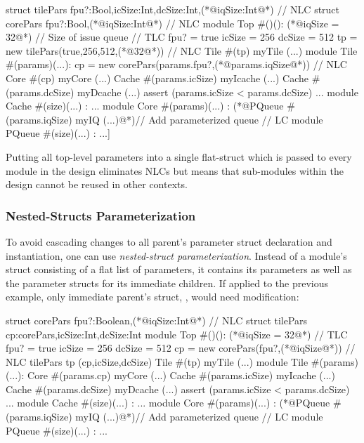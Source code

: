 \begin{phdl}
struct tilePars {fpu?:Bool,icSize:Int,dcSize:Int,(*@\textcolor[rgb]{1,0,0}{iqSize:Int}@*)}     // NLC
struct corePars {fpu?:Bool,(*@\textcolor[rgb]{1,0,0}{iqSize:Int}@*)}                           // NLC
module Top #()():
  (*@\textcolor[rgb]{1,0,0}{iqSize = 32}@*)  // Size of issue queue                            // TLC
  fpu? = true
  icSize = 256
  dcSize = 512
  tp = new tilePars(true,256,512,(*@\textcolor[rgb]{1,0,0}{32}@*))                             // NLC
  Tile #(tp) myTile (...)
module Tile #(params)(...):
  cp = new corePars(params.fpu?,(*@\textcolor[rgb]{1,0,0}{params.iqSize}@*))                   // NLC
  Core  #(cp)  myCore   (...)
  Cache #(params.icSize) myIcache (...)
  Cache #(params.dcSize) myDcache (...)
  assert (params.icSize < params.dcSize) ...
module Cache #(size)(...) : ...
module Core #(params)(...) :
    (*@\textcolor[rgb]{1,0,0}{PQueue \#(params.iqSize) myIQ (...)}@*)// Add parameterized queue // LC
module PQueue #(size)(...) : ...]
\end{phdl} 

Putting all top-level parameters into a single flat-struct which is passed to every module in the design
eliminates NLCs but means that sub-modules within the design cannot be reused in other contexts.

\subsubsection{Nested-Structs Parameterization}

To avoid cascading changes to all parent's parameter struct declaration and instantiation, one can use \emph{nested-struct parameterization}. Instead of a module's struct consisting of a flat list of parameters, it contains its parameters as well as the parameter structs for its immediate children. If applied to the previous example, only  immediate parent's struct, , would need modification:

\begin{phdl}
struct corePars {fpu?:Boolean,(*@\textcolor[rgb]{1,0,0}{iqSize:Int}@*)}                        // NLC
struct tilePars {cp:corePars,icSize:Int,dcSize:Int}
module Top #()():
  (*@\textcolor[rgb]{1,0,0}{iqSize = 32}@*)                                                    // TLC
  fpu? = true
  icSize = 256
  dcSize = 512
  cp = new corePars(fpu?,(*@\textcolor[rgb]{1,0,0}{iqSize}@*))                                 // NLC
  tilePars tp (cp,icSize,dcSize)
  Tile #(tp) myTile (...)
module Tile #(params)(...):
  Core  #(params.cp)  myCore   (...)
  Cache #(params.icSize) myIcache (...)
  Cache #(params.dcSize) myDcache (...)
  assert (params.icSize < params.dcSize) ...
module Cache #(size)(...) : ...
module Core #(params)(...) :
    (*@\textcolor[rgb]{1,0,0}{PQueue \#(params.iqSize) myIQ (...)}@*)// Add parameterized queue // LC
module PQueue #(size)(...) : ...
\end{phdl} 

